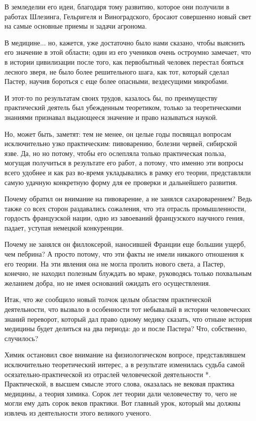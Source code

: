 В земледелии его идеи, благодаря  тому развитию, которое они получили  в
работах Шлезинга, Гельригеля и  Виноградского, бросают совершенно  новый
свет на самые основные приемы н задачи агронома.

В медицине...  но,  кажется, уже  достаточно  было нами  сказано,  чтобы
выяснить его  значение  в  этой  области; один  из  его  учеников  очень
остроумно  замечает,  что   в  истории  цивилизации   после  того,   как
первобытный человек  перестал  бояться  лесного  зверя,  не  было  более
решительного шага, как тот, который сделал Пастер, научив бороться с еще
более опасными, вездесущими микробами.

И этот-то  по результатам  своих трудов,  казалось бы,  по  преимуществу
практический деятель был убежденным теоретиком, только за теоретическими
знаниями признавал выдающееся значение и право называться наукой.

Но, может быть, заметят: тем не  менее, он целые годы посвящал  вопросам
исключительно узко практическим: пивоварению, болезни червей,  сибирской
язве. Да, но но потому, чтобы его ослепляла только практическая  польза,
могущая получиться  в результате  его работ,  а потому,  что именно  эти
вопросы всего  удобнее  и как  раз  во-время укладывались  в  рамку  его
теории, представляли самую  удачную конкретную форму  для ее проверки  и
дальнейшего развития.

Почему обратил он внимание на пивоварение, а не занялся  сахароварением?
Ведь также  со  всех  сторон  раздавались  сожаления,  что  эта  отрасль
промышленности,  гордость   французской   нации,  одно   из   завоеваний
французского научного гения, падает, уступая немецкой конкуренции.

Почему не занялся он филлоксерой, наносившей Франции еще большии  ущерб,
чем пебрина? А просто потому, что эти факты не имели никакого  отношения
к его  теории. На  эти явления  она  не могла  пролить нового  света,  а
Пастер, конечно,  не  находил  полезным блуждать  во  мраке,  руководясь
только похвальным  желанием  добра, но  не  имея оснований  ожидать  его
осуществления.

Итак,  что  же  сообщило   новый  толчок  целым  областям   практической
деятельности,  что  вызвало  в  особенности  тот  небывалый  в   истории
человеческих знаний переворот, который дал право одному медику  сказать,
что отныне история медицины  будет делиться на два  периода: до и  после
Пастера? Что, собственно, случилось?

Химик остановил свое внимание на физиологическом вопросе, представлявшем
исключительно теоретический интерес,  а в  результате изменилась  судьба
самой осязательно-практической из отраслей человеческой деятельности  *.
Практической, в высшем смысле этого слова, оказалась не вековая практика
медицины, а теория химика. Сорок  лет теории дали человечеству то,  чего
не могли ему  дать сорок веков  практики. Вот главный  урок, который  мы
должны извлечь из деятельности этого великого ученого.

